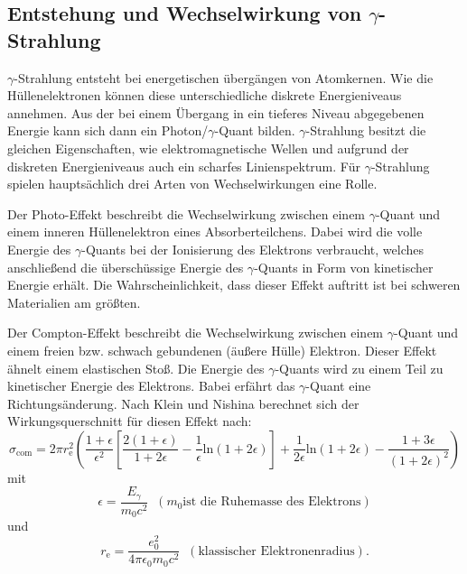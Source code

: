 \documentclass[
  bibliography=totoc,     %
  captions=tableheading,  %
  titlepage=firstiscover, %
]{scrartcl}
\begin{document}
\subsection{Entstehung und Wechselwirkung von \texorpdfstring{$\gamma$}{gamma}-Strahlung}
$\gamma$-Strahlung entsteht bei energetischen übergängen von Atomkernen.
Wie die Hüllenelektronen können diese unterschiedliche diskrete Energieniveaus
annehmen. Aus der bei einem Übergang in ein tieferes Niveau abgegebenen Energie
kann sich dann ein Photon/$\gamma$-Quant bilden. $\gamma$-Strahlung besitzt die
gleichen Eigenschaften, wie elektromagnetische Wellen und aufgrund der diskreten
Energieniveaus auch ein scharfes Linienspektrum.
Für $\gamma$-Strahlung spielen hauptsächlich drei Arten von Wechselwirkungen
eine Rolle.

\noindent
Der Photo-Effekt beschreibt die Wechselwirkung zwischen einem $\gamma$-Quant
und einem inneren Hüllenelektron eines Absorberteilchens. Dabei wird die volle
Energie des $\gamma$-Quants bei der Ionisierung des Elektrons verbraucht, welches
anschließend die überschüssige Energie des $\gamma$-Quants in Form von kinetischer
Energie erhält. Die Wahrscheinlichkeit, dass dieser Effekt auftritt ist bei schweren
Materialien am größten.

\noindent
Der Compton-Effekt beschreibt die Wechselwirkung zwischen einem $\gamma$-Quant
und einem freien bzw. schwach gebundenen (äußere Hülle) Elektron.
Dieser Effekt ähnelt einem elastischen Stoß. Die Energie des $\gamma$-Quants wird zu
einem Teil zu kinetischer Energie des Elektrons. Babei erfährt das $\gamma$-Quant
eine Richtungsänderung.
Nach Klein und Nishina berechnet sich der Wirkungsquerschnitt für diesen Effekt
nach:
\begin{equation}
  \sigma_\mathup{com} = 2 \pi r_\mathup{e}^2 \left( \frac{1 + \epsilon}{\epsilon^2} \left[ \frac{2 ( 1 + \epsilon)}{1 + 2 \epsilon}-\frac{1}{\epsilon} \mathup{ln}
  ( 1 + 2 \epsilon) \right] + \frac{1}{2 \epsilon} \mathup{ln} ( 1 + 2 \epsilon) - \frac{1 + 3 \epsilon}{( 1 + 2 \epsilon)^2} \right)
  \label{eqn:sigma_theo}
\end{equation}
mit
\begin{equation}
  \epsilon = \frac{E_\gamma}{m_0 c^2} \;\; (m_0 \text{ist die Ruhemasse des Elektrons})
\end{equation}
und
\begin{equation}
  r_\mathup{e} = \frac{e_0^2}{4 \pi \epsilon_0 m_0 c^2} \;\; (\text{klassischer Elektronenradius}).
\end{equation}
\end{document}
